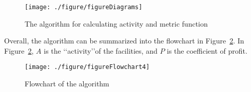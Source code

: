 \documentclass[./main.tex]{subfiles}
\begin{document}
    \begin{figure}[H]
        \centering
        \texttt{[image: ./figure/figureDiagrams]}
        \caption{The algorithm for calculating activity and metric function}
        \label{fig:figureDiagram}
    \end{figure}


    Overall, the algorithm can be summarized into the flowchart in Figure~\ref{fig:figureFlowchart}.
    In Figure~\ref{fig:figureFlowchart}, $A$ is the \lq\lq{activity}\rq\rq of the facilities, and $P$ is the coefficient
    of profit.

    \begin{figure}[H]
        \centering
        \texttt{[image: ./figure/figureFlowchart4]}
        \caption{Flowchart of the algorithm}
        \label{fig:figureFlowchart}
    \end{figure}
\end{document}
